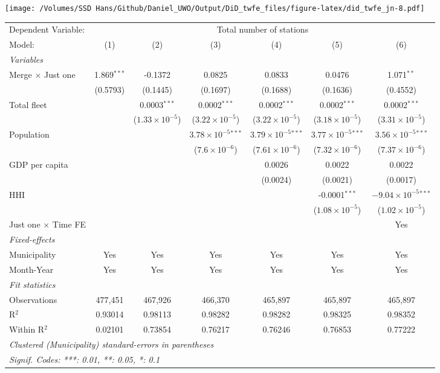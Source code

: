 \documentclass[
]{article}
\begin{document}
\texttt{[image: /Volumes/SSD Hans/Github/Daniel\_UWO/Output/DiD\_twfe\_files/figure-latex/did\_twfe\_jn-8.pdf]}

\begin{tabular}{lcccccc}
\tabularnewline\midrule\midrule
Dependent Variable:&\multicolumn{6}{c}{Total number of stations}\\
Model:&(1) & (2) & (3) & (4) & (5) & (6)\\
\midrule \emph{Variables}&   &   &   &   &   &  \\
Merge $\times $ Just one & 1.869$^{***}$ & -0.1372 & 0.0825 & 0.0833 & 0.0476 & 1.071$^{**}$\\
  &(0.5793) & (0.1445) & (0.1697) & (0.1688) & (0.1636) & (0.4552)\\
Total fleet &    & 0.0003$^{***}$ & 0.0002$^{***}$ & 0.0002$^{***}$ & 0.0002$^{***}$ & 0.0002$^{***}$\\
  &   & ($1.33\times 10^{-5}$) & ($3.22\times 10^{-5}$) & ($3.22\times 10^{-5}$) & ($3.18\times 10^{-5}$) & ($3.31\times 10^{-5}$)\\
Population &    &    & $3.78\times 10^{-5}$$^{***}$ & $3.79\times 10^{-5}$$^{***}$ & $3.77\times 10^{-5}$$^{***}$ & $3.56\times 10^{-5}$$^{***}$\\
  &   &    & ($7.6\times 10^{-6}$) & ($7.61\times 10^{-6}$) & ($7.32\times 10^{-6}$) & ($7.37\times 10^{-6}$)\\
GDP per capita &    &    &    & 0.0026 & 0.0022 & 0.0022\\
  &   &    &    & (0.0024) & (0.0021) & (0.0017)\\
HHI &    &    &    &    & -0.0001$^{***}$ & $-9.04\times 10^{-5}$$^{***}$\\
  &   &    &    &    & ($1.08\times 10^{-5}$) & ($1.02\times 10^{-5}$)\\
Just one $\times$ Time FE &  &  &  &  &  & Yes\\
\midrule \emph{Fixed-effects}&   &   &   &   &   &  \\
Municipality & Yes & Yes & Yes & Yes & Yes & Yes\\
Month-Year & Yes & Yes & Yes & Yes & Yes & Yes\\
\midrule \emph{Fit statistics}&  & & & & & \\
Observations & 477,451&467,926&466,370&465,897&465,897&465,897\\
R$^2$ & 0.93014&0.98113&0.98282&0.98282&0.98325&0.98352\\
Within R$^2$ & 0.02101&0.73854&0.76217&0.76246&0.76853&0.77222\\
\midrule\midrule\multicolumn{7}{l}{\emph{Clustered (Municipality) standard-errors in parentheses}}\\
\multicolumn{7}{l}{\emph{Signif. Codes: ***: 0.01, **: 0.05, *: 0.1}}\\
\end{tabular}
\end{document}
